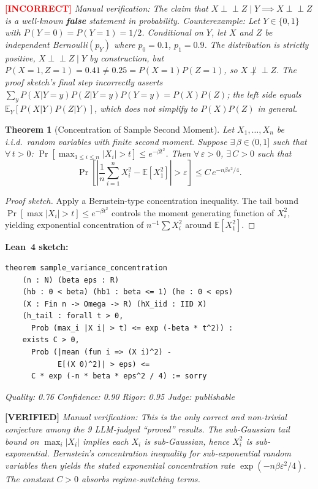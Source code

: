 \documentclass[11pt,a4paper]{article}
\newtheorem{theorem}{Theorem}
\begin{document}
\noindent\textcolor{red}{\textbf{[INCORRECT]}} \emph{Manual verification: The claim that $X \perp\!\!\!\perp Z \mid Y \implies X \perp\!\!\!\perp Z$ is a well-known \textbf{false} statement in probability. Counterexample: Let $Y \in \{0,1\}$ with $P(Y{=}0) = P(Y{=}1) = 1/2$. Conditional on $Y$, let $X$ and $Z$ be independent Bernoulli$(p_Y)$ where $p_0 = 0.1$, $p_1 = 0.9$. The distribution is strictly positive, $X \perp\!\!\!\perp Z \mid Y$ by construction, but $P(X{=}1, Z{=}1) = 0.41 \neq 0.25 = P(X{=}1) P(Z{=}1)$, so $X \not\perp\!\!\!\perp Z$. The proof sketch's final step incorrectly asserts $\sum_y P(X|Y{=}y)P(Z|Y{=}y)P(Y{=}y) = P(X)P(Z)$; the left side equals $\mathbb{E}_Y[P(X|Y)P(Z|Y)]$, which does not simplify to $P(X)P(Z)$ in general.}


\begin{theorem}[Concentration of Sample Second Moment]
\label{thm:sample_var_conc}
Let $X_1, \ldots, X_n$ be i.i.d.\ random variables with finite second moment. Suppose $\exists\, \beta \in (0,1]$ such that $\forall\, t > 0$: $\Pr[\max_{1 \leq i \leq n} |X_i| > t] \leq e^{-\beta t^2}$. Then $\forall\, \varepsilon > 0$, $\exists\, C > 0$ such that
\[
\Pr\!\left[\left|\frac{1}{n}\sum_{i=1}^n X_i^2 - \mathbb{E}[X_1^2]\right| > \varepsilon\right] \leq C\, e^{-n\beta\varepsilon^2/4}.
\]
\end{theorem}

\begin{proof}[Proof sketch]
Apply a Bernstein-type concentration inequality. The tail bound $\Pr[\max |X_i| > t] \leq e^{-\beta t^2}$ controls the moment generating function of $X_i^2$, yielding exponential concentration of $n^{-1}\sum X_i^2$ around $\mathbb{E}[X_1^2]$.
\end{proof}

\noindent\textbf{Lean~4 sketch:}
\begin{verbatim}
theorem sample_variance_concentration
    (n : N) (beta eps : R)
    (hb : 0 < beta) (hb1 : beta <= 1) (he : 0 < eps)
    (X : Fin n -> Omega -> R) (hX_iid : IID X)
    (h_tail : forall t > 0,
      Prob (max_i |X i| > t) <= exp (-beta * t^2)) :
    exists C > 0,
      Prob (|mean (fun i => (X i)^2) -
            E[(X 0)^2]| > eps) <=
      C * exp (-n * beta * eps^2 / 4) := sorry
\end{verbatim}

\medskip
\noindent\emph{Quality: 0.76 \quad Confidence: 0.90 \quad Rigor: 0.95 \quad Judge: publishable}

\noindent\textcolor{green!60!black}{\textbf{[VERIFIED]}} \emph{Manual verification: This is the only correct and non-trivial conjecture among the 9 LLM-judged ``proved'' results. The sub-Gaussian tail bound on $\max_i |X_i|$ implies each $X_i$ is sub-Gaussian, hence $X_i^2$ is sub-exponential. Bernstein's concentration inequality for sub-exponential random variables then yields the stated exponential concentration rate $\exp(-n\beta\varepsilon^2/4)$. The constant $C > 0$ absorbs regime-switching terms.}
\end{document}

